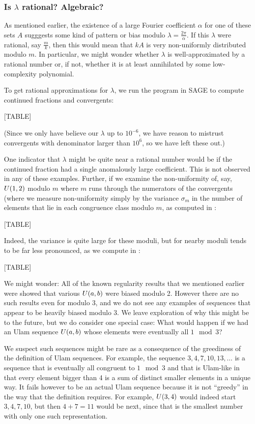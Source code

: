 \documentclass{article}
\theoremstyle{definition}
\theoremstyle{remark}
\numberwithin{equation}{section}
\begin{document}
\subsubsection{Is $\lambda$ rational?  Algebraic?}

As mentioned earlier, the existence of a large Fourier coefficient
$\alpha$ for one of these sets $A$ sugggests some kind of pattern or
bias modulo $\lambda = \frac{2\pi}{\alpha}$.  If this $\lambda$ were
rational, say $\frac{m}{k}$, then this would mean that $kA$ is very
non-uniformly distributed modulo $m$.  In particular, we might wonder
whether $\lambda$ is well-approximated by a rational number or, if
not, whether it is at least annihilated by some low-complexity
polynomial.  

To get rational approximations for $\lambda$, we run the program
 in SAGE to compute continued fractions and
convergents:

[TABLE]

(Since we only have believe our $\lambda$ up to $10^{-6}$, we have
reason to mistrust convergents with denominator larger than $10^6$, so
we have left these out.)

One indicator that $\lambda$ might be quite near a rational number
would be if the continued fraction had a single anomalously large
coefficient.  This is not observed in any of these examples.  Further,
if we examine the non-uniformity of, say, $U(1,2)$ modulo $m$
where $m$ runs through the numerators of the convergents (where we
measure non-uniformity simply by the variance $\sigma_m$ in the number
of elements that lie in each congruence class modulo $m$, as computed
in :

[TABLE]

Indeed, the variance is quite large for these moduli, but for nearby
moduli tends to be far less pronounced, as we compute in
:

[TABLE]

We might wonder: All of the known regularity results that we mentioned
earlier were showed that various $U(a,b)$ were biased modulo 2.
However there are no such results even for modulo 3, and we do not see
any examples of sequences that appear to be heavily biased modulo 3.
We leave exploration of why this might be to the future, but we do
consider one special case: What would happen if we had an Ulam
sequence $U(a,b)$ whose elements were eventually all $1 \mod{3}$?

We suspect such sequences might be rare as a consequence of the
greediness of the definition of Ulam sequences.  For example, the
sequence $3, 4, 7, 10, 13, \ldots$ is a sequence that is eventually
all congruent to $1\mod 3$ and that is Ulam-like in that every element
bigger than 4 is a sum of distinct smaller elements in a unique way.
It fails however to be an actual Ulam sequence because it is not
``greedy'' in the way that the definition requires.  For example,
$U(3,4)$ would indeed start $3, 4, 7, 10$, but then $4+7 = 11$
would be next, since that is the smallest number with only one such
representation.  
\end{document}
